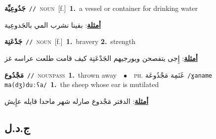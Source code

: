 \documentclass[10pt,a4paper,twoside]{article} %
\begin{document}
\begin{multicols}{2}
{{{{{{{{{{{{{{\setlength\topsep{0pt}\textbf{\foreignlanguage{arabic}{جَدُوعِيِّة}}\ {\color{gray}\texttt{//}\color{black}}\ \textsc{noun}\ [f.]\ \textbf{1.}~a vessel or container for drinking water\  \begin{flushright}\color{gray}\foreignlanguage{arabic}{\textbf{\underline{\foreignlanguage{arabic}{أمثلة}}}: بقينا نشرب المي بالجَدوعِية}\end{flushright}\color{black}} \vspace{2mm}

{\setlength\topsep{0pt}\textbf{\foreignlanguage{arabic}{جَدْعَنِة}}\ {\color{gray}\texttt{//}\color{black}}\ \textsc{noun}\ [f.]\ \textbf{1.}~bravery  \textbf{2.}~strength\  \begin{flushright}\color{gray}\foreignlanguage{arabic}{\textbf{\underline{\foreignlanguage{arabic}{أمثلة}}}: إِجى يتفصحن ويورجيهم الجَدْعَنِة كيف قامت طلعت عراسه غز}\end{flushright}\color{black}} \vspace{2mm}

{\setlength\topsep{0pt}\textbf{\foreignlanguage{arabic}{مَجْدُوع}}\ {\color{gray}\texttt{//}\color{black}}\ \textsc{noun\textunderscore pass}\ \textbf{1.}~thrown away\ \ $\bullet$\ \ \textsc{ph.} \color{gray} \foreignlanguage{arabic}{غَنَمِة مَجْدُوعَة}\color{black}\ {\color{gray}\texttt{/{\sffamily ɣaname ma(dʒ)duːʕa}/}\color{black}}\ \textbf{1.}~the sheep whose ear is mutilated\  \begin{flushright}\color{gray}\foreignlanguage{arabic}{\textbf{\underline{\foreignlanguage{arabic}{أمثلة}}}: الدفتر مَجْدوع صارله شهر ماحدا قايله عإِيش}\end{flushright}\color{black}} \vspace{2mm}

\vspace{-3mm}
\subsection*{\color{blue}\foreignlanguage{arabic}{ج.د.ل}\color{blue}{}} 

}}}}}}}}}}}}}
\end{multicols}
\end{document}
